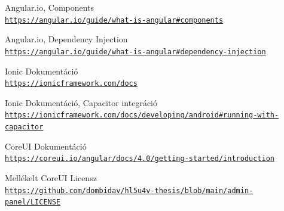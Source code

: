 \documentclass[a4paper,12pt]{thesis-ekf}
\theoremstyle{definition}
\begin{document}
\begin{thebibliography}{2}
    Angular.io, Components
    \\\texttt{\url{https://angular.io/guide/what-is-angular\#components}}
    
    Angular.io, Dependency Injection
    \\\texttt{\url{https://angular.io/guide/what-is-angular\#dependency-injection}}
    
    Ionic Dokumentáció
    \\\texttt{\url{https://ionicframework.com/docs}}
    
    Ionic Dokumentáció, Capacitor integráció
    \\\texttt{\url{https://ionicframework.com/docs/developing/android\#running-with-capacitor}}
    
    CoreUI Dokumentáció
    \\\texttt{\url{https://coreui.io/angular/docs/4.0/getting-started/introduction}}
    
    Mellékelt CoreUI Licensz
    \\\texttt{\url{https://github.com/dombidav/hl5u4v-thesis/blob/main/admin-panel/LICENSE}}
    
    
    
\end{thebibliography}
		
\end{document}
